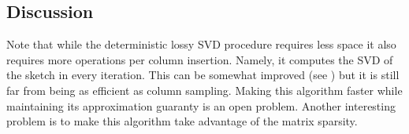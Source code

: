 \documentclass{article}
\begin{document}
\subsection*{Discussion}
Note that while the deterministic lossy SVD procedure requires less space it also requires more operations per column insertion.
Namely, it computes the SVD of the sketch in every iteration. 
This can be somewhat improved (see \cite{LibertyMatrixSketching2012}) but it is still far from being as efficient as column sampling.
Making this algorithm faster while maintaining its approximation guaranty is an open problem.
Another interesting problem is to make this algorithm take advantage of the matrix sparsity.






\end{document}
